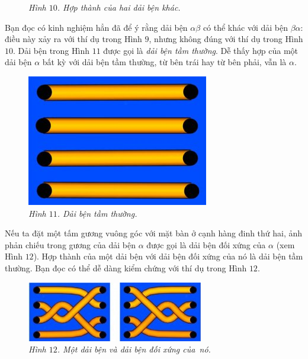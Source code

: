\begin{multicols}{2}
\begin{figure}[H]
		\caption{\small\textit{\color{duongvaotoanhoc}Hình $10$. Hợp thành của hai dải bện khác.}}
		\vspace*{-10pt}
	\end{figure}
	Bạn đọc có kinh nghiệm hẳn đã để ý rằng dải bện $\alpha \beta$ có thể khác với dải bện $\beta \alpha$: điều này xảy ra với thí dụ trong Hình $9$, nhưng không đúng với thí dụ trong Hình $10$.
	\vskip 0.1cm
	Dải bện trong Hình $11$ được gọi là \textit{dải bện tầm thường}. Dễ thấy hợp của một dải bện $\alpha$ bất kỳ với dải bện tầm thường, từ bên trái hay từ bên phải, vẫn là $\alpha$.
	\begin{figure}[H]
		\vspace*{-5pt}
		\centering
		\captionsetup{labelformat= empty, justification=centering}
		\includegraphics[width= 0.47\linewidth]{fig_11}
		\caption{\small\textit{\color{duongvaotoanhoc}Hình $11$. Dải bện tầm thường.}}
		\vspace*{-10pt}
	\end{figure}
	Nếu ta đặt một tấm gương vuông góc với mặt bàn ở cạnh hàng đinh thứ hai, ảnh phản chiếu trong gương của dải bện $\alpha$ được gọi là dải bện đối xứng của $\alpha$ (xem Hình $12$). Hợp thành của một dải bện với dải bện đối xứng của nó là dải bện tầm thường. Bạn đọc có thể dễ dàng kiểm chứng với thí dụ trong Hình $12$.
	\begin{figure}[H]
		\vspace*{-5pt}
		\centering
		\captionsetup{labelformat= empty, justification=centering}
		\includegraphics[width= 0.97\linewidth]{fig_12}
		\caption{\small\textit{\color{duongvaotoanhoc}Hình $12$. Một dải bện và dải bện đối xứng của~nó.}}

\end{figure}
\end{multicols}
